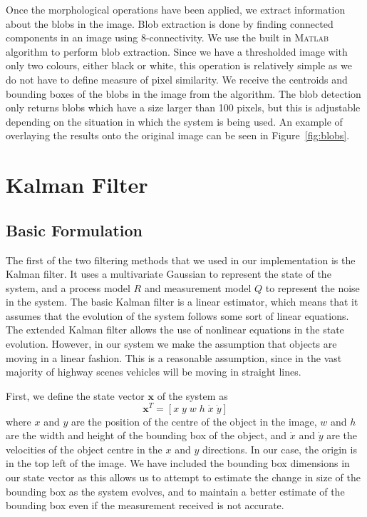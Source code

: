 \documentclass[conference]{IEEEtran}
\begin{document}
Once the morphological operations have been applied, we extract information
about the blobs in the image. Blob extraction is done by finding connected
components in an image using 8-connectivity. We use the built in \textsc{Matlab}
algorithm to perform blob extraction. Since we have a thresholded image with
only two colours, either black or white, this operation is relatively simple as
we do not have to define measure of pixel similarity. We receive the centroids
and bounding boxes of the blobs in the image from the algorithm. The blob
detection only returns blobs which have a size larger than 100 pixels, but this
is adjustable depending on the situation in which the system is being used. An
example of overlaying the results onto the original image can be seen in
Figure~\ref{fig:blobs}.
\section{Kalman Filter}
\subsection{Basic Formulation}
The first of the two filtering methods that we used in our implementation is
the Kalman filter. It uses a multivariate Gaussian to represent the state of the
system, and a process model $R$ and measurement model $Q$ to represent the noise
in the system. The basic Kalman filter is a linear estimator, which means that
it assumes that the evolution of the system follows some sort of linear
equations. The extended Kalman filter allows the use of nonlinear equations in
the state evolution. However, in our system we make the assumption that objects
are moving in a linear fashion. This is a reasonable assumption, since in the
vast majority of highway scenes vehicles will be moving in straight lines. 

First, we define the state vector $\mathbf{x}$ of the system as
\begin{equation}
  \label{eq:statevec}
  \mathbf{x}^T=\left[x\;y\;w\;h\;\dot{x}\;\dot{y}\right]
\end{equation}
where $x$ and $y$ are the position of the centre of the object in the image, $w$
and $h$ are the width and height of the bounding box of the object, and
$\dot{x}$ and $\dot{y}$ are the velocities of the object centre in the $x$ and $y$
directions. In our case, the origin is in the top left of the image. We have
included the bounding box dimensions in our state vector as this allows us to
attempt to estimate the change in size of the bounding box as the system
evolves, and to maintain a better estimate of the bounding box even if the
measurement received is not accurate.
\end{document}
